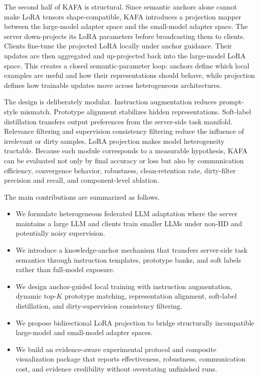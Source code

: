 \documentclass[conference]{IEEEtran}
\begin{document}
The second half of KAFA is structural. Since semantic anchors alone cannot make LoRA tensors shape-compatible, KAFA introduces a projection mapper between the large-model adapter space and the small-model adapter space. The server down-projects its LoRA parameters before broadcasting them to clients. Clients fine-tune the projected LoRA locally under anchor guidance. Their updates are then aggregated and up-projected back into the large-model LoRA space. This creates a closed semantic-parameter loop: anchors define which local examples are useful and how their representations should behave, while projection defines how trainable updates move across heterogeneous architectures.

The design is deliberately modular. Instruction augmentation reduces prompt-style mismatch. Prototype alignment stabilizes hidden representations. Soft-label distillation transfers output preferences from the server-side task manifold. Relevance filtering and supervision consistency filtering reduce the influence of irrelevant or dirty samples. LoRA projection makes model heterogeneity tractable. Because each module corresponds to a measurable hypothesis, KAFA can be evaluated not only by final accuracy or loss but also by communication efficiency, convergence behavior, robustness, clean-retention rate, dirty-filter precision and recall, and component-level ablation.

The main contributions are summarized as follows.
\begin{itemize}
\item We formulate heterogeneous federated LLM adaptation where the server maintains a large LLM and clients train smaller LLMs under non-IID and potentially noisy supervision.
\item We introduce a knowledge-anchor mechanism that transfers server-side task semantics through instruction templates, prototype banks, and soft labels rather than full-model exposure.
\item We design anchor-guided local training with instruction augmentation, dynamic top-$K$ prototype matching, representation alignment, soft-label distillation, and dirty-supervision consistency filtering.
\item We propose bidirectional LoRA projection to bridge structurally incompatible large-model and small-model adapter spaces.
\item We build an evidence-aware experimental protocol and composite visualization package that reports effectiveness, robustness, communication cost, and evidence credibility without overstating unfinished runs.
\end{itemize}
\end{document}
